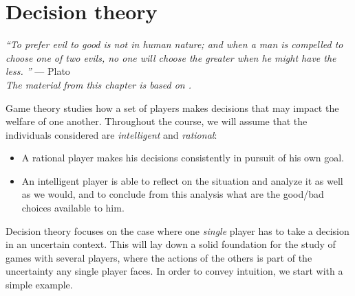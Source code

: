 \ifx \globalmark \undefined %
	


\else

\fi



\chapter{Decision theory}
{\large{\itshape
``To prefer evil to good is not in human nature; and when a man is compelled to choose one of two evils, no one will choose the greater when he might have the less.
''} --- Plato\\
}
{\small{\itshape
The material from this chapter is based on \cite[pp 1 - 23]{MyGTAO}.}\\
}
\label{chap:Decision}



Game theory studies how a set of players makes decisions that may impact the welfare of one another.
Throughout the course, we will assume that the individuals considered are \emph{intelligent} and \emph{rational}:
\begin{itemize}
\item A rational player makes his decisions consistently in pursuit of his own goal.
\item An intelligent player is able to reflect on the situation and analyze it as well as we would, and to conclude from this analysis what are the good/bad choices available to him.
\end{itemize}
Decision theory focuses on the case where one \emph{single} player has to take a decision in an uncertain context. This will lay down a solid foundation for the study of games with several players, where the actions of the others is part of the uncertainty any single player faces. In order to convey intuition, we start with a simple example.

